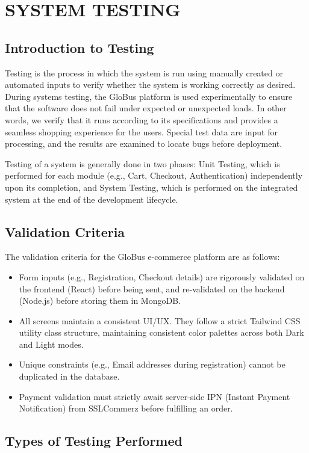 \chapter{SYSTEM TESTING}
\section{Introduction to Testing}
Testing is the process in which the system is run using manually created or automated inputs to verify whether the system is working correctly as desired. During systems testing, the GloBus platform is used experimentally to ensure that the software does not fail under expected or unexpected loads. In other words, we verify that it runs according to its specifications and provides a seamless shopping experience for the users. Special test data are input for processing, and the results are examined to locate bugs before deployment.

Testing of a system is generally done in two phases: Unit Testing, which is performed for each module (e.g., Cart, Checkout, Authentication) independently upon its completion, and System Testing, which is performed on the integrated system at the end of the development lifecycle.

\section{Validation Criteria}
The validation criteria for the GloBus e-commerce platform are as follows:
\begin{itemize}
    \item Form inputs (e.g., Registration, Checkout details) are rigorously validated on the frontend (React) before being sent, and re-validated on the backend (Node.js) before storing them in MongoDB.
    \item All screens maintain a consistent UI/UX. They follow a strict Tailwind CSS utility class structure, maintaining consistent color palettes across both Dark and Light modes.
    \item Unique constraints (e.g., Email addresses during registration) cannot be duplicated in the database.
    \item Payment validation must strictly await server-side IPN (Instant Payment Notification) from SSLCommerz before fulfilling an order.
\end{itemize}

\section{Types of Testing Performed}

